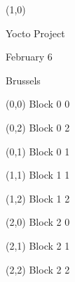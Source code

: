 \documentclass{beamer}
\begin{document}
\begin{textblock}{1}(1,0)
\fontsize{32}{36}\selectfont
\begin{centering}
Yocto Project

February 6

Brussels

\end{centering}
\end{textblock}

\begin{textblock}{1}(0,0)
\huge
Block 0 0
\end{textblock}


\begin{textblock}{1}(0,2)
\huge
Block 0 2
\end{textblock}

\begin{textblock}{1}(0,1)
\huge
Block 0 1
\end{textblock}

\begin{textblock}{1}(1,1)
\huge
Block 1 1
\end{textblock}

\begin{textblock}{1}(1,2)
\huge
Block 1 2
\end{textblock}

\begin{textblock}{1}(2,0)
\huge
Block 2 0
\end{textblock}

\begin{textblock}{1}(2,1)
\huge
Block 2 1
\end{textblock}

\begin{textblock}{1}(2,2)
\huge
Block 2 2
\end{textblock}

%
\end{document}
